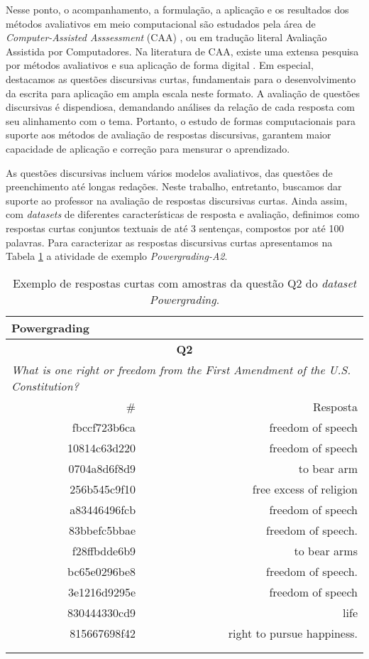 Nesse ponto, o acompanhamento, a formulação, a aplicação e os resultados dos métodos avaliativos em meio computacional são estudados pela área de \textit{Computer-Assisted Asssessment} (CAA) \cite{bogarin2018}, ou em tradução literal Avaliação Assistida por Computadores. Na literatura de CAA, existe uma extensa pesquisa por métodos avaliativos e sua aplicação de forma digital \cite{perez-marin2009}. Em especial, destacamos as questões discursivas curtas, fundamentais para o desenvolvimento da escrita para aplicação em ampla escala neste formato. A avaliação de questões discursivas é dispendiosa, demandando análises da relação de cada resposta com seu alinhamento com o tema. Portanto, o estudo de formas computacionais para suporte aos métodos de avaliação de respostas discursivas, garantem maior capacidade de aplicação e correção para mensurar o aprendizado.

As questões discursivas incluem vários modelos avaliativos, das questões de preenchimento até longas redações. Neste trabalho, entretanto, buscamos dar suporte ao professor na avaliação de respostas discursivas curtas. Ainda assim, com \textit{datasets} de diferentes características de resposta e avaliação, definimos como respostas curtas conjuntos textuais de até 3 sentenças, compostos por até 100 palavras. Para caracterizar as respostas discursivas curtas apresentamos na Tabela \ref{tab-pgq2-exemplo} a atividade de exemplo \textit{Powergrading-A2}.

\begin{table}
\centering
\caption{Exemplo de respostas curtas com amostras da questão Q2 do \textit{dataset Powergrading}.}
\label{tab-pgq2-exemplo}
\begin{tabular}{ r | r}
\hline
\multicolumn{2}{l}{\textbf{Powergrading}} \\ \hline
\multicolumn{2}{c}{\textbf{Q2}} \\ \hline 
\multicolumn{2}{l}{\textit{What is one right or freedom from the First Amendment of the U.S. Constitution?}} \\ \hline
 \# & Resposta \\ \hline
fbccf723b6ca & freedom of speech  \\
10814c63d220 & freedom of speech \\
0704a8d6f8d9 & to bear arm \\
256b545c9f10 & free excess of religion \\
a83446496fcb & freedom of speech \\
83bbefc5bbae & freedom of speech. \\
f28ffbdde6b9 & to bear arms \\
bc65e0296be8 & freedom of speech. \\
3e1216d9295e & freedom of speech \\
830444330cd9 & life \\
815667698f42 & right to pursue happiness. \\
\\
\\
\hline
\hline
\end{tabular}
\end{table}

